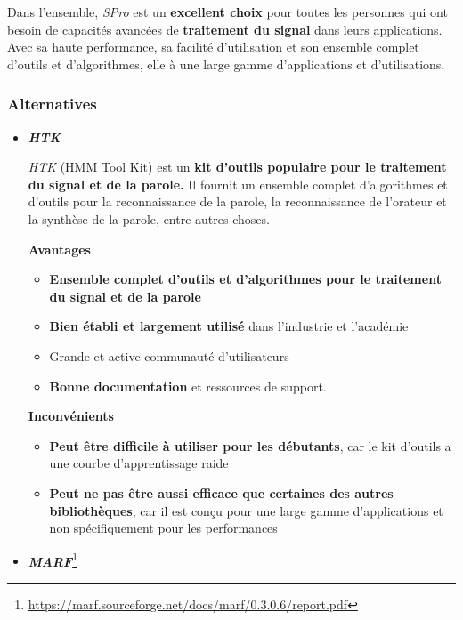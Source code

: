 Dans l'ensemble, \textit{SPro} est un \textbf{excellent choix} pour toutes les personnes qui ont besoin de capacités avancées de \textbf{traitement
      du signal} dans leurs applications. Avec sa haute performance, sa facilité d'utilisation et son ensemble complet d'outils et d'algorithmes, elle  à une
large gamme d'applications et d'utilisations.

\subsubsection{Alternatives}

\begin{itemize}
      \item \large\textbf{\textit{HTK}} \normalsize

            \textit{HTK} (HMM Tool Kit) est un \textbf{kit d'outils populaire pour le traitement du signal et de la parole.} Il fournit un ensemble complet d'algorithmes et d'outils
            pour la reconnaissance de la parole, la reconnaissance de l'orateur et la synthèse de la parole, entre autres choses.

            \textbf{Avantages}
            \begin{itemize}
                  \item \textbf{Ensemble complet d'outils et d'algorithmes pour le traitement du signal et de la parole}
                  \item \textbf{Bien établi et largement utilisé} dans l'industrie et l'académie
                  \item Grande et active communauté d'utilisateurs
                  \item \textbf{Bonne documentation} et ressources de support.
            \end{itemize}


            \textbf{Inconvénients}
            \begin{itemize}
                  \item \textbf{Peut être difficile à utiliser pour les débutants}, car le kit d'outils a une courbe d'apprentissage raide
                  \item \textbf{Peut ne pas être aussi efficace que certaines des autres bibliothèques}, car il est conçu pour une large gamme
                        d'applications et non spécifiquement pour les performances
            \end{itemize}

      \item\large\textbf{\textit{MARF}}\normalsize\footnote{\url{https://marf.sourceforge.net/docs/marf/0.3.0.6/report.pdf}}



\end{itemize}
